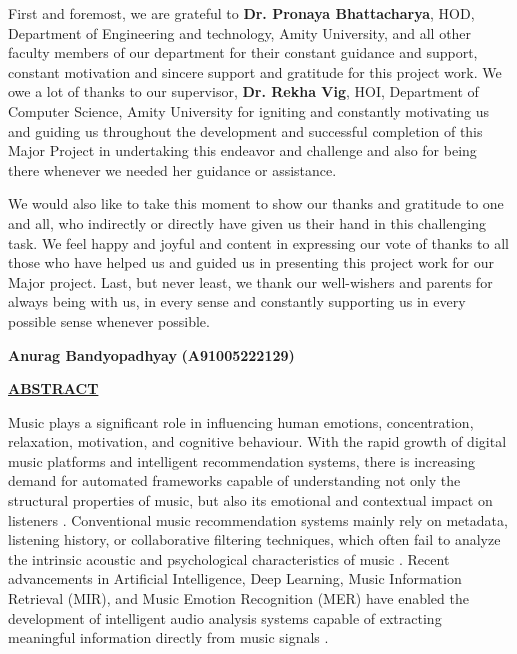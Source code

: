 \documentclass[12pt,a4paper]{report}
\begin{document}
First and foremost, we are grateful to \textbf{Dr. Pronaya Bhattacharya}, HOD, Department of Engineering and technology, Amity University, and all other faculty members of our department for their constant guidance and support, constant motivation and sincere support and gratitude for this project work. We owe a lot of thanks to our supervisor, \textbf{Dr. Rekha Vig}, HOI, Department of Computer Science, Amity University for igniting and constantly motivating us and guiding us throughout the development and successful completion of this Major Project in undertaking this endeavor and challenge and also for being there whenever we needed her guidance or assistance.


We would also like to take this moment to show our thanks and gratitude to one and all, who indirectly or directly have given us their hand in this challenging task. We feel happy and joyful and content in expressing our vote of thanks to all those who have helped us and guided us in presenting this project work for our Major project. Last, but never least, we thank our well-wishers and parents for always being with us, in every sense and constantly supporting us in every possible sense whenever possible.



\vspace{2 cm}                       
\begin{flushright}
\textbf{Anurag Bandyopadhyay}
\textbf{(A91005222129)}\\
\end{flushright}
\vspace{0.3cm}

\newpage

\begin{center}
 \textbf{\underline {ABSTRACT}}
\end{center}

\vspace{0.5cm}

Music plays a significant role in influencing human emotions, concentration, relaxation, motivation, and cognitive behaviour. With the rapid growth of digital music platforms and intelligent recommendation systems, there is increasing demand for automated frameworks capable of understanding not only the structural properties of music, but also its emotional and contextual impact on listeners \cite{r1,r13}. Conventional music recommendation systems mainly rely on metadata, listening history, or collaborative filtering techniques, which often fail to analyze the intrinsic acoustic and psychological characteristics of music \cite{r11,r17}. Recent advancements in Artificial Intelligence, Deep Learning, Music Information Retrieval (MIR), and Music Emotion Recognition (MER) have enabled the development of intelligent audio analysis systems capable of extracting meaningful information directly from music signals \cite{r3,r4,r5,r14,r24,r25}.
\end{document}
